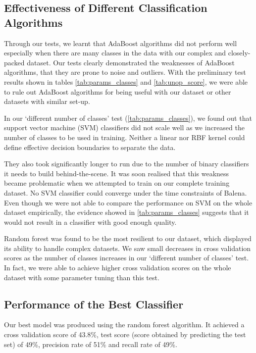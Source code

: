 \subsection*{Effectiveness of Different Classification Algorithms}
Through our tests, we learnt that AdaBoost algorithms did not perform well especially when there are many classes in the data with our complex and closely-packed dataset. Our tests clearly demonstrated the weaknesses of AdaBoost algorithms, that they are prone to noise and outliers. With the preliminary test results shown in tables \ref{tab:params_classes} and \ref{tab:unop_score}, we were able to rule out AdaBoost algorithms for being useful with our dataset or other datasets with similar set-up.

In our `different number of classes' test (\autoref{tab:params_classes}), we found out that support vector machine (SVM) classifiers did not scale well as we increased the number of classes to be used in training. Neither a linear nor RBF kernel could define effective decision boundaries to separate the data. 

They also took significantly longer to run due to the number of binary classifiers it needs to build behind-the-scene. It was soon realised that this weakness became problematic when we attempted to train on our complete training dataset. No SVM classifier could converge under the time constraints of Balena. Even though we were not able to compare the performance on SVM on the whole dataset empirically, the evidence showed in \autoref{tab:params_classes} suggests that it would not result in a classifier with good enough quality.

Random forest was found to be the most resilient to our dataset, which displayed its ability to handle complex datasets. We saw small decreases in cross validation scores as the number of classes increases in our `different number of classes' test. In fact, we were able to achieve higher cross validation scores on the whole dataset with some parameter tuning than this test. 

\newpage
\subsection*{Performance of the Best Classifier}
Our best model was produced using the random forest algorithm. It achieved a cross validation score of 43.8\%, test score (score obtained by predicting the test set) of 49\%, precision rate of 51\% and recall rate of 49\%.  

